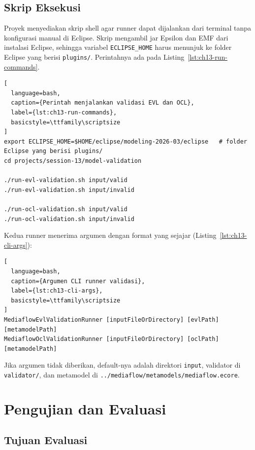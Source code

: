 \subsection{Skrip Eksekusi}

Proyek menyediakan skrip shell agar runner dapat dijalankan dari terminal tanpa konfigurasi manual di Eclipse. Skrip mengambil jar Epsilon dan EMF dari instalasi Eclipse, sehingga variabel \texttt{ECLIPSE\_HOME} harus menunjuk ke folder Eclipse yang berisi \texttt{plugins/}. Perintahnya ada pada Listing~\ref{lst:ch13-run-commands}.

\begin{lstlisting}[
  language=bash,
  caption={Perintah menjalankan validasi EVL dan OCL},
  label={lst:ch13-run-commands},
  basicstyle=\ttfamily\scriptsize
]
export ECLIPSE_HOME=$HOME/eclipse/modeling-2026-03/eclipse   # folder Eclipse yang berisi plugins/
cd projects/session-13/model-validation

./run-evl-validation.sh input/valid
./run-evl-validation.sh input/invalid

./run-ocl-validation.sh input/valid
./run-ocl-validation.sh input/invalid
\end{lstlisting}

Kedua runner menerima argumen dengan format yang sejajar (Listing~\ref{lst:ch13-cli-args}):

\begin{lstlisting}[
  language=bash,
  caption={Argumen CLI runner validasi},
  label={lst:ch13-cli-args},
  basicstyle=\ttfamily\scriptsize
]
MediaflowEvlValidationRunner [inputFileOrDirectory] [evlPath] [metamodelPath]
MediaflowOclValidationRunner [inputFileOrDirectory] [oclPath] [metamodelPath]
\end{lstlisting}

Jika argumen tidak diberikan, default-nya adalah direktori \texttt{input}, validator di \texttt{validator/}, dan metamodel di \texttt{../mediaflow/metamodels/mediaflow.ecore}.

\section{Pengujian dan Evaluasi}

\subsection{Tujuan Evaluasi}

